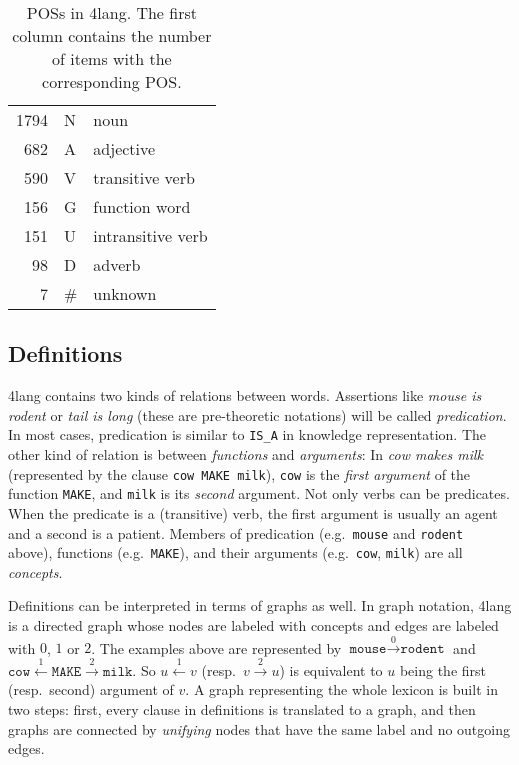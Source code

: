 \documentclass[a4paper,10pt]{article}
\begin{document}
\begin{table}[h]
\begin{center}
\begin{tabular}{rll}
\toprule 
1794	& N & noun
\\ 682	& A & adjective
\\ 590	& V & transitive verb
\\ 156	& G & function word
\\ 151	& U & intransitive verb
\\ 98	& D & adverb
\\ 7	& \# & unknown
\\\bottomrule
\end{tabular}
\end{center}
\caption{POSs in 4lang. The first column contains the number of items with the corresponding POS.}
\label{table_pos}
\end{table}


\subsection{Definitions}
4lang contains two kinds of relations between words. Assertions like \emph{mouse is rodent} or \emph{tail is long} (these are pre-theoretic notations) will be called \emph{predication}. In most cases, predication is similar to \texttt{IS\_A} in knowledge representation. The other kind of relation is between \emph{functions} and \emph{arguments}: In \emph{cow makes milk} (represented by the clause \texttt{cow MAKE milk}), \texttt{cow} is the \emph{first argument} of the function \texttt{MAKE}, and \texttt{milk} is its \emph{second} argument. Not only verbs can be predicates. When the predicate is a (transitive) verb, the first argument is usually an agent and a second is a patient. Members of predication (e.g.\ \texttt{mouse} and \texttt{rodent} above), functions (e.g.\ \texttt{MAKE}), and their arguments (e.g.\ \texttt{cow}, \texttt{milk}) are all \emph{concepts}.

Definitions can be interpreted in terms of graphs as well. In graph notation, 4lang is a directed graph whose nodes are labeled with concepts and edges are labeled with $0$, $1$ or $2$. The examples above are represented by $\texttt{mouse}\xrightarrow{0}\texttt{rodent}$ and $\texttt{cow}\xleftarrow{1}\texttt{MAKE}\xrightarrow{2}\texttt{milk}$. So $u\xleftarrow{1}v$ (resp.\ $v\xrightarrow 2 u$) is equivalent to $u$ being the first (resp.\ second) argument of $v$.
A graph representing the whole lexicon is built in two steps: first, every clause in definitions is translated to a graph, and then graphs are connected by \emph{unifying} nodes that have the same label and no outgoing edges.
\end{document}
